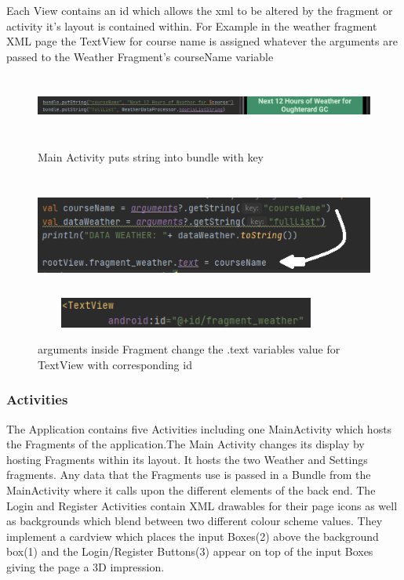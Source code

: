 Each View contains an id which allows the xml to be altered by the fragment or activity it's layout is contained within. For Example in the weather fragment XML page the TextView for course name is assigned whatever the arguments are passed to the Weather Fragment's courseName variable

\begin{figure}[H]
    \centering
    \includegraphics[width=14cm, height = 2cm]{img/bundle arguments.PNG}
        \caption{Main Activity puts string into bundle with key}
    \includegraphics[width=12cm, height = 4cm]{img/fragment_arguments.PNG}
    \includegraphics[width=10cm, height = 1cm]{img/textview_id.PNG}
    \caption{arguments inside Fragment change the .text variables value for TextView with corresponding id}
    \label{fig:altas config}
\end{figure}

\subsubsection{Activities}
The Application contains five Activities including one MainActivity which hosts the Fragments of the application.The Main Activity changes its display by hosting Fragments within its layout. It hosts the two Weather and Settings fragments. Any data that the Fragments use is passed in a Bundle from the MainActivity where it calls upon the different elements of the back end. 
\newline
\newline
The Login and Register Activities contain XML drawables for their page icons as well as backgrounds which blend between two different colour scheme values. They implement a cardview which places the input Boxes(2)  above the background box(1) and the Login/Register Buttons(3) appear on top of the input Boxes giving the page a 3D impression. 

